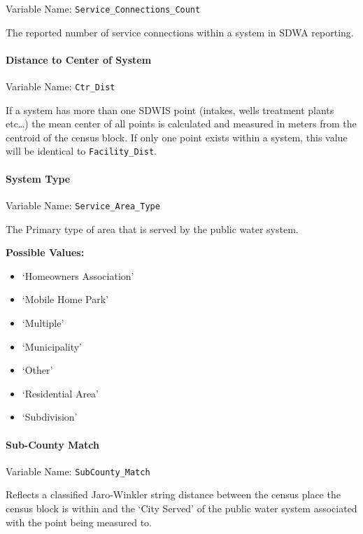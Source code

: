 \documentclass[
  letterpaper,
  DIV=11,
  numbers=noendperiod,
  oneside]{scrartcl}
\let\oldparagraph\paragraph
\renewcommand{\paragraph}[1]{\oldparagraph{#1}\mbox{}}
\providecommand{\tightlist}{%
  \setlength{\itemsep}{0pt}\setlength{\parskip}{0pt}}\usepackage{longtable,booktabs,array}
\begin{document}
Variable Name: \texttt{Service\_Connections\_Count}

The reported number of service connections within a system in SDWA
reporting.

\paragraph{Distance to Center of
System}\label{distance-to-center-of-system}

Variable Name: \texttt{Ctr\_Dist}

If a system has more than one SDWIS point (intakes, wells treatment
plants etc\ldots) the mean center of all points is calculated and
measured in meters from the centroid of the census block. If only one
point exists within a system, this value will be identical to
\texttt{Facility\_Dist}.

\paragraph{System Type}\label{system-type}

Variable Name: \texttt{Service\_Area\_Type}

The Primary type of area that is served by the public water system.

\textbf{Possible Values:}

\begin{itemize}
\tightlist
\item
  `Homeowners Association'
\item
  `Mobile Home Park'
\item
  `Multiple'
\item
  `Municipality'\\
\item
  `Other'
\item
  `Residential Area'
\item
  `Subdivision'
\end{itemize}

\paragraph{Sub-County Match}\label{sub-county-match}

Variable Name: \texttt{SubCounty\_Match}

Reflects a classified Jaro-Winkler string distance between the census
place the census block is within and the `City Served' of the public
water system associated with the point being measured to.
\end{document}
